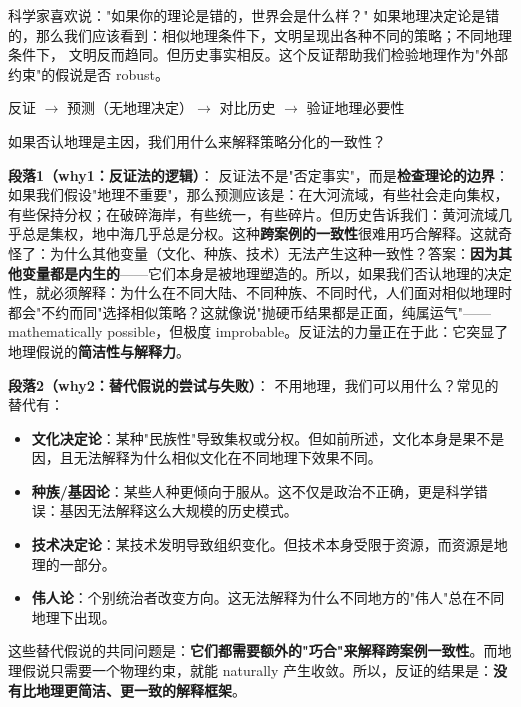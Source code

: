 \documentclass[../main.tex]{subfiles}
\begin{document}
	\begin{motivation}
				科学家喜欢说："如果你的理论是错的，世界会是什么样？" 如果地理决定论是错的，那么我们应该看到：相似地理条件下，文明呈现出各种不同的策略；不同地理条件下，
		文明反而趋同。但历史事实相反。这个反证帮助我们检验地理作为"外部约束"的假说是否 robust。
	\end{motivation}
	
	\begin{logicmap}
		反证 $\rightarrow$ 预测（无地理决定）$\rightarrow$ 对比历史 $\rightarrow$ 验证地理必要性
	\end{logicmap}
	
	\begin{questionbox}
		如果否认地理是主因，我们用什么来解释策略分化的一致性？
	\end{questionbox}
	
	\textbf{段落1（why1：反证法的逻辑）}：  
	反证法不是"否定事实"，而是\textbf{检查理论的边界}：如果我们假设"地理不重要"，那么预测应该是：在大河流域，有些社会走向集权，有些保持分权；在破碎海岸，有些统一，有些碎片。但历史告诉我们：黄河流域几乎总是集权，地中海几乎总是分权。这种\textbf{跨案例的一致性}很难用巧合解释。这就奇怪了：为什么其他变量（文化、种族、技术）无法产生这种一致性？答案：\textbf{因为其他变量都是内生的}——它们本身是被地理塑造的。所以，如果我们否认地理的决定性，就必须解释：为什么在不同大陆、不同种族、不同时代，人们面对相似地理时都会"不约而同"选择相似策略？这就像说"抛硬币结果都是正面，纯属运气"—— mathematically possible，但极度 improbable。反证法的力量正在于此：它突显了地理假说的\textbf{简洁性与解释力}。
	
	\textbf{段落2（why2：替代假说的尝试与失败）}：  
	不用地理，我们可以用什么？常见的替代有：  
    \begin{itemize}
      \item \textbf{文化决定论}：某种"民族性"导致集权或分权。但如前所述，文化本身是果不是因，且无法解释为什么相似文化在不同地理下效果不同。  
      \item \textbf{种族/基因论}：某些人种更倾向于服从。这不仅是政治不正确，更是科学错误：基因无法解释这么大规模的历史模式。  
      \item \textbf{技术决定论}：某技术发明导致组织变化。但技术本身受限于资源，而资源是地理的一部分。  
      \item \textbf{伟人论}：个别统治者改变方向。这无法解释为什么不同地方的"伟人"总在不同地理下出现。  
    \end{itemize}
    这些替代假说的共同问题是：\textbf{它们都需要额外的"巧合"来解释跨案例一致性}。而地理假说只需要一个物理约束，就能 naturally 产生收敛。所以，反证的结果是：\textbf{没有比地理更简洁、更一致的解释框架}。
	
\end{document}
